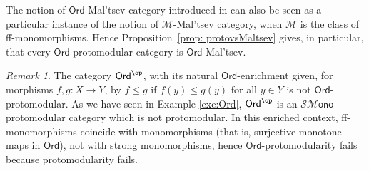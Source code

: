 \documentclass[11pt]{amsart}
\theoremstyle{plain}
\theoremstyle{definition}
\theoremstyle{remark}
\newtheorem{remark}[subsection]{Remark}
\newcommand{\Ord}{\ensuremath{\mathsf{Ord}}}
\newcommand{\M}{\ensuremath{\mathscr{M}}}
\newcommand{\SMono}{\ensuremath{\mathscr{SM}\mathsf{ono}}}
\begin{document}
The notion of $\Ord$-Mal'tsev category introduced in \cite{CR} can also be seen as a particular instance of the notion of $\M$-Mal'tsev category, when $\M$ is the class of ff-monomorphisms. Hence Proposition~\ref{prop: protovsMaltsev}  gives, in particular, that every $\Ord$-protomodular category is $\Ord$-Mal'tsev.

\begin{remark}
The category $\Ord^\op$, with its natural $\Ord$-enrichment given, for morphisms $f,g\colon X\to Y$, by $f\le g$ if $f(y)\le g(y)$ for all $y\in Y$ is not $\Ord$-protomodular. As we have seen in Example \ref{exe:Ord}, $\Ord^\op$ is an $\SMono$-protomodular category which is not protomodular. In this enriched context, ff-monomorphisms coincide with monomorphisms (that is, surjective monotone maps in $\Ord$), not with strong monomorphisms, hence $\Ord$-protomodularity fails because protomodularity fails.
\end{remark}
\end{document}
